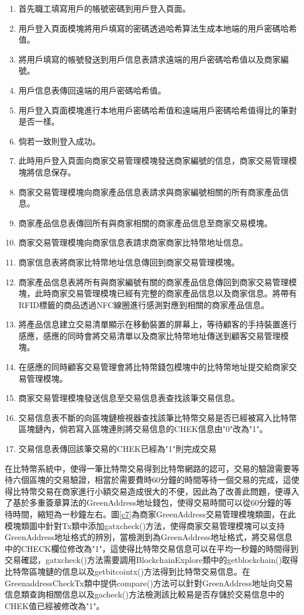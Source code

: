 	\begin{enumerate}
	\item 首先職工填寫用戶的帳號密碼到用戶登入頁面。
	\item 用戶登入頁面模塊將用戶填寫的密碼透過哈希算法生成本地端的用戶密碼哈希值。
	\item 將用戶填寫的帳號發送到用戶信息表請求遠端的用戶密碼哈希值以及商家編號。
	\item 用戶信息表傳回遠端的用戶密碼哈希值。
	\item 用戶登入頁面模塊進行本地用戶密碼哈希值和遠端用戶密碼哈希值得比的筆對是否一樣。
	\item 倘若一致則登入成功。
	\item 此時用戶登入頁面向商家交易管理模塊發送商家編號的信息，商家交易管理模塊將信息保存。
	\item 商家交易管理模塊向商家產品信息表請求與商家編號相關的所有商家產品信息。
	\item 商家產品信息表傳回所有與商家相關的商家產品信息至商家交易模塊。
	\item 商家交易管理模塊向商家信息表請求商家商家比特幣地址信息。
	\item 商家信息表將商家比特幣地址信息傳回到商家交易管理模塊。
	\item 商家產品信息表將所有與商家編號有關的商家產品信息傳回到商家交易管理模塊，此時商家交易管理模塊已經有完整的商家產品信息以及商家信息。將帶有RFID標籤的商品透過NFC線圈進行感測對應到相關的商家產品信息。
	\item 將產品信息建立交易清單顯示在移動裝置的屏幕上，等待顧客的手持裝置進行感應，感應的同時會將交易清單以及商家比特幣地址傳送到顧客交易管理模塊。

	\item 在感應的同時顧客交易管理會將比特幣錢包模塊中的比特幣地址提交給商家交易管理模塊。
	\item 商家交易管理模塊發送信息至交易信息表查找該筆交易信息。
	\item 交易信息表不斷的向區塊鏈檢視器查找該筆比特幣交易是否已經被寫入比特幣區塊鏈內，倘若寫入區塊連則將交易信息的CHEK信息由"0"改為"1"。
	\item 交易信息表傳回該筆交易的CHEK已經為"1"則完成交易
	
	\end{enumerate}

	在比特幣系統中，使得一筆比特幣交易得到比特幣網路的認可，交易的驗證需要等待六個區塊的交易驗證，相當於需要費時60分鐘的時間等待一個交易的完成，這使得比特幣交易在商家進行小額交易造成很大的不便，因此為了改善此問題，便導入了基於多重簽章算法的GreenAddress地址錢包，使得交易時間可以從60分鐘的等待時間，縮短為一秒鐘左右。圖\ref{c7}為商家GreenAddress交易管理模塊類圖，在此模塊類圖中針對Tx類中添加gatxcheck()方法，使得商家交易管理模塊可以支持GreenAddress地址格式的辨別，當檢測到為GreenAddress地址格式，將交易信息中的CHECK欄位修改為"1"，這使得比特幣交易信息可以在平均一秒鐘的時間得到交易確認，gatxcheck()方法需要調用BlockchainExplore類中的getblockchain()取得比特幣區塊鏈的信息以及getbitcointx()方法得到比特幣交易信息。在GreenaddressCheckTx類中提供compare()方法可以針對GreenAddress地址向交易信息類查詢相關信息以及gacheck()方法檢測該比較易是否存儲於交易信息中的CHEK值已經被修改為"1"。

